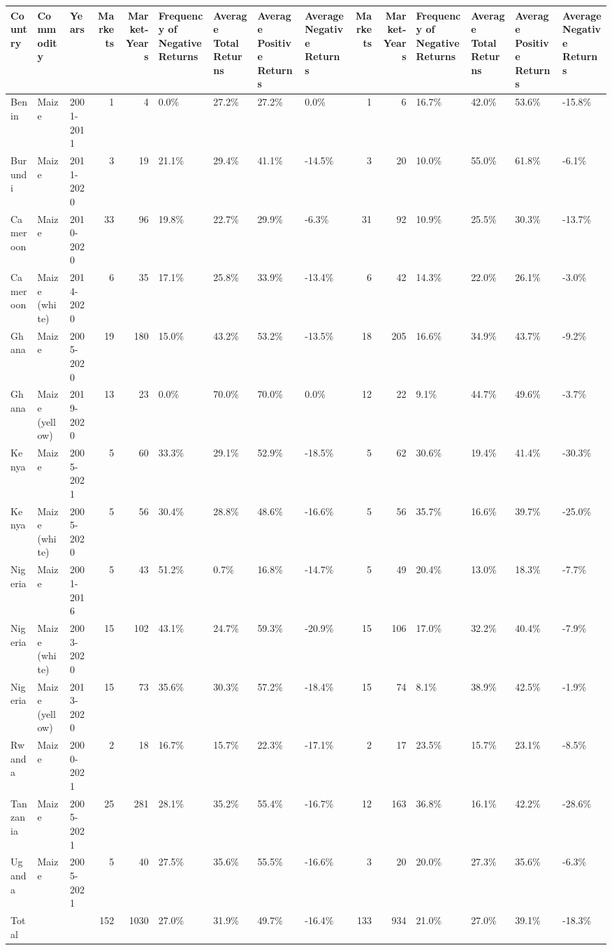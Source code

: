 \begin{table}[ht]
\centering
\begin{tabular}{lllrrllllrrllll}
  \hline
Country & Commodity & Years & Markets & Market-Years & Frequency of Negative Returns & Average Total Returns & Average Positive Returns & Average Negative Returns & Markets & Market-Years & Frequency of Negative Returns & Average Total Returns & Average Positive Returns & Average Negative Returns \\ 
  \hline
Benin & Maize & 2001-2011 &   1 &   4 & 0.0\% & 27.2\% & 27.2\% & 0.0\% &   1 &   6 & 16.7\% & 42.0\% & 53.6\% & -15.8\% \\ 
  Burundi & Maize & 2011-2020 &   3 &  19 & 21.1\% & 29.4\% & 41.1\% & -14.5\% &   3 &  20 & 10.0\% & 55.0\% & 61.8\% & -6.1\% \\ 
  Cameroon & Maize & 2010-2020 &  33 &  96 & 19.8\% & 22.7\% & 29.9\% & -6.3\% &  31 &  92 & 10.9\% & 25.5\% & 30.3\% & -13.7\% \\ 
  Cameroon & Maize (white) & 2014-2020 &   6 &  35 & 17.1\% & 25.8\% & 33.9\% & -13.4\% &   6 &  42 & 14.3\% & 22.0\% & 26.1\% & -3.0\% \\ 
  Ghana & Maize & 2005-2020 &  19 & 180 & 15.0\% & 43.2\% & 53.2\% & -13.5\% &  18 & 205 & 16.6\% & 34.9\% & 43.7\% & -9.2\% \\ 
  Ghana & Maize (yellow) & 2019-2020 &  13 &  23 & 0.0\% & 70.0\% & 70.0\% & 0.0\% &  12 &  22 & 9.1\% & 44.7\% & 49.6\% & -3.7\% \\ 
  Kenya & Maize & 2005-2021 &   5 &  60 & 33.3\% & 29.1\% & 52.9\% & -18.5\% &   5 &  62 & 30.6\% & 19.4\% & 41.4\% & -30.3\% \\ 
  Kenya & Maize (white) & 2005-2020 &   5 &  56 & 30.4\% & 28.8\% & 48.6\% & -16.6\% &   5 &  56 & 35.7\% & 16.6\% & 39.7\% & -25.0\% \\ 
  Nigeria & Maize & 2001-2016 &   5 &  43 & 51.2\% & 0.7\% & 16.8\% & -14.7\% &   5 &  49 & 20.4\% & 13.0\% & 18.3\% & -7.7\% \\ 
  Nigeria & Maize (white) & 2003-2020 &  15 & 102 & 43.1\% & 24.7\% & 59.3\% & -20.9\% &  15 & 106 & 17.0\% & 32.2\% & 40.4\% & -7.9\% \\ 
  Nigeria & Maize (yellow) & 2013-2020 &  15 &  73 & 35.6\% & 30.3\% & 57.2\% & -18.4\% &  15 &  74 & 8.1\% & 38.9\% & 42.5\% & -1.9\% \\ 
  Rwanda & Maize & 2000-2021 &   2 &  18 & 16.7\% & 15.7\% & 22.3\% & -17.1\% &   2 &  17 & 23.5\% & 15.7\% & 23.1\% & -8.5\% \\ 
  Tanzania & Maize & 2005-2021 &  25 & 281 & 28.1\% & 35.2\% & 55.4\% & -16.7\% &  12 & 163 & 36.8\% & 16.1\% & 42.2\% & -28.6\% \\ 
  Uganda & Maize & 2005-2021 &   5 &  40 & 27.5\% & 35.6\% & 55.5\% & -16.6\% &   3 &  20 & 20.0\% & 27.3\% & 35.6\% & -6.3\% \\ 
  Total &  &  & 152 & 1030 & 27.0\% & 31.9\% & 49.7\% & -16.4\% & 133 & 934 & 21.0\% & 27.0\% & 39.1\% & -18.3\% \\ 
   \hline
\end{tabular}
\end{table}
